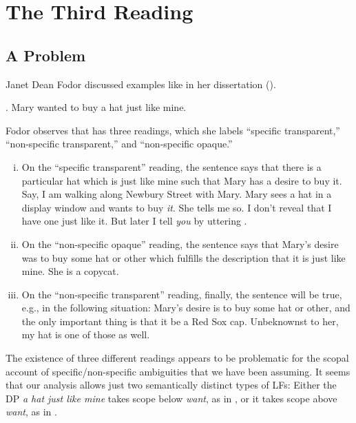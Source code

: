 \chapter{The Third Reading}\label{cha:the_third_reading} 


\minitoc

\section{A Problem}

Janet Dean Fodor discussed examples like \Next in her dissertation (\citeyear{fodor-diss}).

\ex. Mary wanted to buy a hat just like mine.

Fodor observes that \Last has three readings, which she labels ``specific transparent,'' ``non-specific transparent,'' and ``non-specific opaque.''

\begin{enumerate}[(i)] 
	\item On the ``specific transparent'' reading, the sentence says that there is a particular hat which is just like mine such that Mary has a desire to buy it. Say, I am walking along Newbury Street with Mary. Mary sees a hat in a display window and wants to buy \emph{it}. She tells me so. I don't reveal that I have one just like it. But later I tell \emph{you} by uttering \Last. 
	\item On the ``non-specific opaque'' reading, the sentence says that Mary's desire was to buy some hat or other which fulfills the description that it is just like mine. She is a copycat. 
	\item On the ``non-specific transparent'' reading, finally, the sentence will be true, e.g., in the following situation: Mary's desire is to buy some hat or other, and the only important thing is that it be a Red Sox cap. Unbeknownst to her, my hat is one of those as well. 
\end{enumerate}
%
The existence of three different readings appears to be problematic for the scopal account of specific/non-specific ambiguities that we have been assuming. It seems that our analysis allows just two semantically distinct types of LFs: Either the DP \emph{a hat just like mine} takes scope below \emph{want}, as in \Next, or it takes scope above \emph{want}, as in \NNext.

